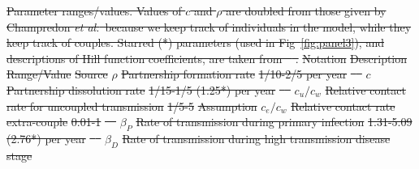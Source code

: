 \documentclass[10pt,letterpaper]{article}
\renewcommand{\figurename}{Fig}
\newcommand{\etal}{\textit{et al.}}
\providecommand{\DIFdeltex}[1]{{\protect\color{red}\sout{#1}}}                      %
\providecommand{\DIFdelbegin}{} %
\providecommand{\DIFdelFL}[1]{\DIFdel{#1}} %
\providecommand{\DIFdel}[1]{\texorpdfstring{\DIFdeltex{#1}}{}} %
\newcommand{\DIFscaledelfig}{0.5}
\newlength{\DIFdelgraphicswidth} %
\newlength{\DIFdelgraphicsheight} %
\newcommand{\DIFdelincludegraphics}[2][]{%
\sbox{\DIFdelgraphicsbox}{\DIFOincludegraphics[#1]{#2}}%
\settoboxwidth{\DIFdelgraphicswidth}{\DIFdelgraphicsbox} %
\settoboxtotalheight{\DIFdelgraphicsheight}{\DIFdelgraphicsbox} %
\scalebox{\DIFscaledelfig}{%
\parbox[b]{\DIFdelgraphicswidth}{\usebox{\DIFdelgraphicsbox}\\[-\baselineskip] \rule{\DIFdelgraphicswidth}{0em}}\llap{\resizebox{\DIFdelgraphicswidth}{\DIFdelgraphicsheight}{%
\setlength{\unitlength}{\DIFdelgraphicswidth}%
\begin{picture}(1,1)%
\thicklines\linethickness{2pt} %
{\color[rgb]{1,0,0}\put(0,0){\framebox(1,1){}}}%
{\color[rgb]{1,0,0}\put(0,0){\line( 1,1){1}}}%
{\color[rgb]{1,0,0}\put(0,1){\line(1,-1){1}}}%
\end{picture}%
}\hspace*{3pt}}} %
} %
\DeclareRobustCommand{\DIFdelbegin}{\DIFOdelbegin \let\includegraphics\DIFdelincludegraphics} %
\begin{document}
\DIFdelbegin %

{%
\DIFdelFL{Parameter ranges/values.  Values of $c$ and $\rho$ are doubled from those given by Champredon \etal\ because we keep track of individuals in the model, while they keep track of couples. Starred (*) parameters (used in \figurename~\ref{fig:panel3}), and descriptions of Hill function coefficients, are taken from \mbox{%
\cite{shirreff_transmission_2011}}%
.}}
\DIFdelFL{Notation }%
\DIFdelFL{Description }%
\DIFdelFL{Range/Value }%
\DIFdelFL{Source}%
\DIFdelFL{$\rho$ }%
\DIFdelFL{Partnership formation rate }%
\DIFdelFL{1/10-2/5 per year }%
\DIFdelFL{\mbox{%
\cite{champredon_hiv_2013} }%
}%
\DIFdelFL{$c$ }%
\DIFdelFL{Partnership dissolution rate }%
\DIFdelFL{1/15-1/5 (1.25*) per year }%
\DIFdelFL{\mbox{%
\cite{champredon_hiv_2013} }%
}%
\DIFdelFL{$c_u/c_w$ }%
\DIFdelFL{Relative contact rate for uncoupled transmission }%
\DIFdelFL{1/5-5 }%
\DIFdelFL{Assumption }%
\DIFdelFL{$c_e/c_w$ }%
\DIFdelFL{Relative contact rate extra-couple }%
\DIFdelFL{0.01-1 }%
\DIFdelFL{\mbox{%
\cite{champredon_hiv_2013} }%
}%
\DIFdelFL{$\beta_P$ }%
\DIFdelFL{Rate of transmission during primary infection }%
\DIFdelFL{1.31-5.09 (2.76*) per year }%
\DIFdelFL{\mbox{%
\cite{hollingsworth_hiv1_2008} }%
}%
\DIFdelFL{$\beta_D$ }%
\DIFdelFL{Rate of transmission during high transmission disease stage }%
\end{document}
